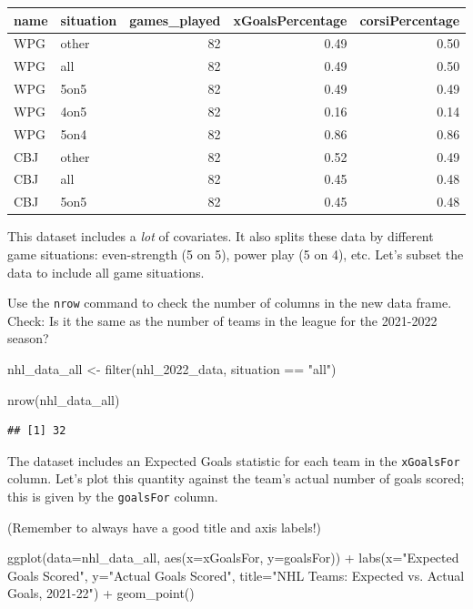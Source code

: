 \documentclass[
]{book}
\newenvironment{Shaded}{\begin{snugshade}}{\end{snugshade}}
\newcommand{\AttributeTok}[1]{\textcolor[rgb]{0.77,0.63,0.00}{#1}}
\newcommand{\FunctionTok}[1]{\textcolor[rgb]{0.00,0.00,0.00}{#1}}
\newcommand{\NormalTok}[1]{#1}
\newcommand{\OtherTok}[1]{\textcolor[rgb]{0.56,0.35,0.01}{#1}}
\newcommand{\SpecialCharTok}[1]{\textcolor[rgb]{0.00,0.00,0.00}{#1}}
\newcommand{\StringTok}[1]{\textcolor[rgb]{0.31,0.60,0.02}{#1}}
\theoremstyle{definition}
\theoremstyle{definition}
\theoremstyle{definition}
\theoremstyle{definition}
\theoremstyle{remark}
\begin{document}
\begin{table}
\centering
\begin{tabular}[t]{l|l|r|r|r}
\hline
name & situation & games\_played & xGoalsPercentage & corsiPercentage\\
\hline
WPG & other & 82 & 0.49 & 0.50\\
\hline
WPG & all & 82 & 0.49 & 0.50\\
\hline
WPG & 5on5 & 82 & 0.49 & 0.49\\
\hline
WPG & 4on5 & 82 & 0.16 & 0.14\\
\hline
WPG & 5on4 & 82 & 0.86 & 0.86\\
\hline
CBJ & other & 82 & 0.52 & 0.49\\
\hline
CBJ & all & 82 & 0.45 & 0.48\\
\hline
CBJ & 5on5 & 82 & 0.45 & 0.48\\
\hline
\end{tabular}
\end{table}

This dataset includes a \emph{lot} of covariates. It also splits these data by different game situations: even-strength (5 on 5), power play (5 on 4), etc. Let's subset the data to include all game situations.

Use the \texttt{nrow} command to check the number of columns in the new data frame. Check: Is it the same as the number of teams in the league for the 2021-2022 season?

\begin{Shaded}
\begin{Highlighting}[]
\NormalTok{nhl\_data\_all }\OtherTok{\textless{}{-}} \FunctionTok{filter}\NormalTok{(nhl\_2022\_data, situation }\SpecialCharTok{==} \StringTok{"all"}\NormalTok{)}

\FunctionTok{nrow}\NormalTok{(nhl\_data\_all)}
\end{Highlighting}
\end{Shaded}

\begin{verbatim}
## [1] 32
\end{verbatim}

The dataset includes an Expected Goals statistic for each team in the \texttt{xGoalsFor} column. Let's plot this quantity against the team's actual number of goals scored; this is given by the \texttt{goalsFor} column.

(Remember to always have a good title and axis labels!)

\begin{Shaded}
\begin{Highlighting}[]
\FunctionTok{ggplot}\NormalTok{(}\AttributeTok{data=}\NormalTok{nhl\_data\_all, }\FunctionTok{aes}\NormalTok{(}\AttributeTok{x=}\NormalTok{xGoalsFor, }\AttributeTok{y=}\NormalTok{goalsFor)) }\SpecialCharTok{+} \FunctionTok{labs}\NormalTok{(}\AttributeTok{x=}\StringTok{"Expected Goals Scored"}\NormalTok{, }\AttributeTok{y=}\StringTok{"Actual Goals Scored"}\NormalTok{, }\AttributeTok{title=}\StringTok{"NHL Teams: Expected vs. Actual Goals, 2021{-}22"}\NormalTok{) }\SpecialCharTok{+} \FunctionTok{geom\_point}\NormalTok{()}
\end{Highlighting}
\end{Shaded}
\end{document}
